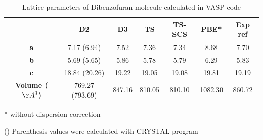  	\begin{table}[H]
 	\caption{Lattice parameters of Dibenzofuran molecule calculated in VASP code}  \label{table-dibenzofuransol}
 	\begin{center}
 		\begin{threeparttable}
 			\begin{tabular}{c c c c c c c}
 				\toprule
 				& \textbf{D2} & \textbf{D3} & \textbf{TS} & \textbf{TS-SCS} & \textbf{PBE*} & \textbf{Exp} ref\cite{dideberg1972crystal} \\
 				\midrule
 				\textbf{a} & 7.17 (6.94) & 7.52 & 7.36 &7.34 & 8.68 & 7.70 \\
 				\textbf{b}& 5.69 (5.65) & 5.86& 5.78 & 5.79 & 6.29 & 5.83\\
 				\textbf{c}& 18.84 (20.26) & 19.22 & 19.05 & 19.08 & 19.81 & 19.19\\
 				\textbf{Volume ($\AA^{3}$)}& 769.27 (793.69) & 847.16 & 810.05 & 810.10 & 1082.30 & 860.72\\
 				\bottomrule
 			\end{tabular}
 			
 				\begin{tablenotes}
 					\item[*] without dispersion correction
 					\item[()] Parenthesis values were calculated with CRYSTAL program
 				\end{tablenotes}
 			\end{threeparttable}
 		\end{center}
 	\end{table}
 	
